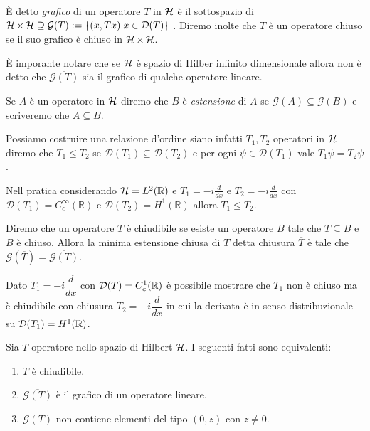 \begin{definition}
    È detto \emph{grafico} di un operatore $T$ in $ \operatorname{\mathcal{H}} $ è il sottospazio di $ \operatorname{\mathcal{H}} \times \operatorname{\mathcal{H}} \supseteq \mathcal{G}(T):= \{ (x, Tx) | x \in \mathcal{D}(T) \}$ . 
Diremo inolte che $T$ è un operatore chiuso se il suo grafico è chiuso in $\operatorname{\mathcal{H}} \times \operatorname{\mathcal{H}}$.
\end{definition}

È imporante notare che se $\operatorname{\mathcal{H}}$ è spazio di Hilber infinito dimensionale allora non è detto che $\overline{\mathcal{G}(T)}$ sia il grafico di qualche operatore lineare.

\begin{definition}
    Se $A$ è un operatore in $\operatorname{\mathcal{H}}$ diremo che $B$ è \emph{estensione} di $A$ se $\mathcal{G}(A) \subseteq \mathcal{G}(B) $ e scriveremo che $A \subseteq B$. 
\end{definition}

\begin{example}
    Possiamo costruire una relazione d'ordine siano infatti $T_1, T_2$ operatori in $\operatorname{\mathcal{H}}$ diremo che $T_1 \leq T_2$ se $\mathcal{D}(T_1) \subseteq \mathcal{D}(T_2)$ e per ogni $\psi \in \mathcal{D}(T_1)$ vale $T_1 \psi = T_2 \psi$.

    Nell pratica considerando $\operatorname{\mathcal{H}} = L^2(\mathbb{R})$ e $T_1 = -i \frac{d}{dx}$ e $T_2 = -i \frac{d}{dx}$ con $\mathcal{D}(T_1) = C^\infty_c(\mathbb{R})$ e $\mathcal{D}(T_2) = H^1(\mathbb{R})$ allora $T_1 \leq T_2$.
\end{example}

\begin{definition}
    Diremo che un operatore $T$ è chiudibile se esiste un operatore $B$ tale che $T \subseteq B$ e $B$ è chiuso. Allora la minima estensione chiusa di $T$ detta chiusura $\overline{T}$ è tale che $\mathcal{G}(\overline{T}) = \overline{\mathcal{G}(T)}$.
\end{definition}

\begin{example}
    Dato $T_1= -i \dfrac{d}{dx}$ con $\mathcal{D}(T) = C^1_c(\operatorname{\mathbb{R}})$ è possibile mostrare che $T_1$ non è chiuso ma è chiudibile con chiusura $T_2 = -i \dfrac{d}{dx}$ in cui la derivata è in senso distribuzionale su $\mathcal{D}(T_1)=H^1(\operatorname{\mathbb{R}})$.
\end{example} 


\begin{proposition}
    Sia $T$ operatore nello spazio di Hilbert $\operatorname{\mathcal{H}}$. I seguenti fatti sono equivalenti:
\begin{enumerate}
    \item $T$ è chiudibile.
    \item $\overline{\mathcal{G}(T)}$ è il grafico di un operatore lineare.
    \item $\overline{\mathcal{G}(T)}$ non contiene elementi del tipo $(0,z)$ con $z \neq 0$.
\end{enumerate}
\end{proposition}


